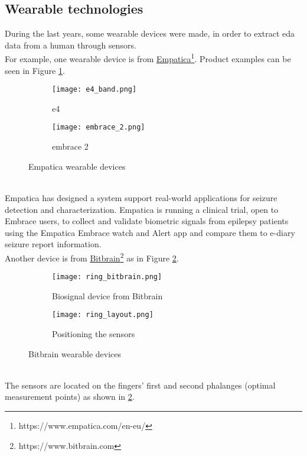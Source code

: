\subsection{Wearable technologies}
During the last years, some wearable devices were made, in order to extract \gls{eda} data from a human through sensors.
\\ \indent
For example, one wearable device is from \href{https://www.empatica.com/en-eu/}{Empatica}\footnote{https://www.empatica.com/en-eu/}. Product examples can be seen in Figure \ref{fig:empatica_devices}.
\begin{figure}[h]
    \centering
    \begin{subfigure}{{0.45\textwidth}}
    		\texttt{[image: e4\_band.png]}
    		\caption{e4}
    \end{subfigure}
    \begin{subfigure}{0.45\textwidth}
    		\texttt{[image: embrace\_2.png]} 
    		\caption{embrace 2}
    \end{subfigure}
    \caption{Empatica wearable devices}
    \label{fig:empatica_devices}
\end{figure}
\\
Empatica has designed a system support real-world applications for seizure detection and characterization. Empatica is running a clinical trial, open to Embrace users, to collect and validate biometric signals from epilepsy patients using the Empatica Embrace watch and Alert app and compare them to e-diary seizure report information.
\\ \indent
Another device is from \href{https://www.bitbrain.com}{Bitbrain}\footnote{https://www.bitbrain.com} as in Figure \ref{fig:bitbrain}.
\begin{figure}[h]
    \centering
    \begin{subfigure}{{0.45\textwidth}}
    		\texttt{[image: ring\_bitbrain.png]}
    		\caption{Biosignal device from Bitbrain}
    \end{subfigure}
    \begin{subfigure}{0.45\textwidth}
    		\texttt{[image: ring\_layout.png]} 
    		\caption{Positioning the sensors}
    \end{subfigure}
    \caption{Bitbrain wearable devices}
    \label{fig:bitbrain}
\end{figure}
\\
The sensors are located on the fingers' first and second phalanges (optimal measurement points) as shown in \ref{fig:bitbrain}.
